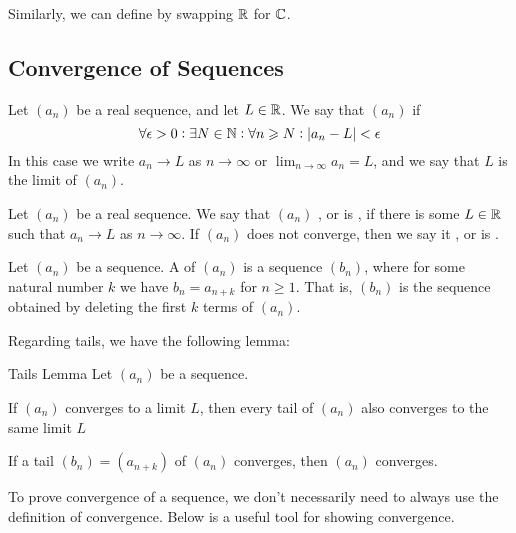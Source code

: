 \documentclass{styles/tufte}
\begin{document}
  Similarly, we can define  by swapping $\mathbb{R}$ for $\mathbb{C}$.
  
  
  \subsection{Convergence of Sequences}
    
    \begin{definition}{}{}
      Let $(a_n)$ be a real sequence, and let $L \in \mathbb{R}$. We say that $(a_n)$  if
      \[ \forall \epsilon > 0 : \exists N \in \NN : \forall n \geqslant N : \abs{a_n - L} < \epsilon \]
      In this case we write $a_n \to L$ as $n \to \infty$ or $\displaystyle \lim_{n \to \infty} a_n = L$, and we say that $L$ is the limit of $(a_n)$.
    \end{definition}
    
    \begin{definition}{}{}
      Let $(a_n)$ be a real sequence. We say that $(a_n)$ , or is , if there is some $L \in \mathbb{R}$ such that $a_n \to L$ as $n \to \infty$. If $(a_n)$ does not converge, then we say it , or is .
    \end{definition}
    
    \begin{definition}{}{}
      Let $(a_n)$ be a sequence. A  of $(a_n)$ is a sequence $(b_n)$, where for some natural number $k$ we have $b_n = a_{n+k}$ for $n \geqslant 1$. That is, $(b_n)$ is the sequence obtained by deleting the first $k$ terms of $(a_n)$.
    \end{definition}
    
    Regarding tails, we have the following lemma:
    
    \begin{lemma}{Tails Lemma}{}
      Let $(a_n)$ be a sequence.
      \begin{romanenum}
        \item If $(a_n)$ converges to a limit $L$, then every tail of $(a_n)$ also converges to the same limit $L$
        \item If a tail $(b_n) = (a_{n+k})$ of $(a_n)$ converges, then $(a_n)$ converges.
      \end{romanenum}
    \end{lemma}
    
    To prove convergence of a sequence, we don't necessarily need to always use the definition of convergence. Below is a useful tool for showing convergence.
    
\end{document}
